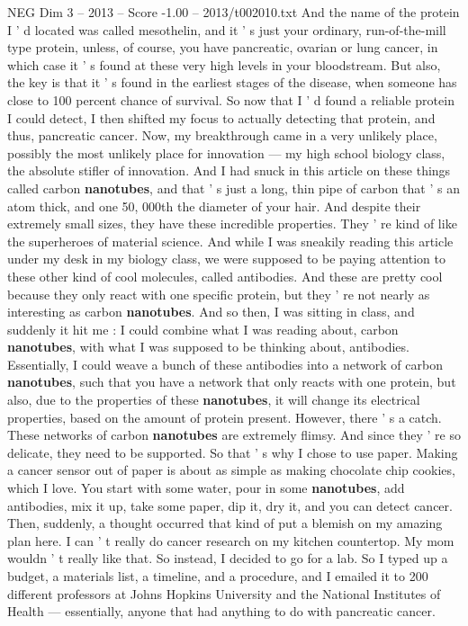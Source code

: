 \begin{textsample}{NEG Dim 3 – 2013 – Score -1.00 – 2013/t002010.txt}
And the name of the protein I ' d located was called mesothelin, and it ' s just your ordinary, run-of-the-mill type protein, unless, of course, you have pancreatic, ovarian or lung cancer, in which case it ' s found at these very high levels in your bloodstream.
But also, the key is that it ' s found in the earliest stages of the disease, when someone has close to 100 percent chance of survival.
So now that I ' d found a reliable protein I could detect, I then shifted my focus to actually detecting that protein, and thus, pancreatic cancer.
Now, my breakthrough came in a very unlikely place, possibly the most unlikely place for innovation — my high school biology class, the absolute stifler of innovation.
And I had snuck in this article on these things called carbon \textbf{nanotubes}, and that ' s just a long, thin pipe of carbon that ' s an atom thick, and one 50, 000th the diameter of your hair.
And despite their extremely small sizes, they have these incredible properties.
They ' re kind of like the superheroes of material science.
And while I was sneakily reading this article under my desk in my biology class, we were supposed to be paying attention to these other kind of cool molecules, called antibodies.
And these are pretty cool because they only react with one specific protein, but they ' re not nearly as interesting as carbon \textbf{nanotubes}.
And so then, I was sitting in class, and suddenly it hit me : I could combine what I was reading about, carbon \textbf{nanotubes}, with what I was supposed to be thinking about, antibodies.
Essentially, I could weave a bunch of these antibodies into a network of carbon \textbf{nanotubes}, such that you have a network that only reacts with one protein, but also, due to the properties of these \textbf{nanotubes}, it will change its electrical properties, based on the amount of protein present.
However, there ' s a catch.
These networks of carbon \textbf{nanotubes} are extremely flimsy.
And since they ' re so delicate, they need to be supported.
So that ' s why I chose to use paper.
Making a cancer sensor out of paper is about as simple as making chocolate chip cookies, which I love.
You start with some water, pour in some \textbf{nanotubes}, add antibodies, mix it up, take some paper, dip it, dry it, and you can detect cancer.
Then, suddenly, a thought occurred that kind of put a blemish on my amazing plan here.
I can ' t really do cancer research on my kitchen countertop.
My mom wouldn ' t really like that.
So instead, I decided to go for a lab.
So I typed up a budget, a materials list, a timeline, and a procedure, and I emailed it to 200 different professors at Johns Hopkins University and the National Institutes of Health — essentially, anyone that had anything to do with pancreatic cancer.

\end{textsample}

